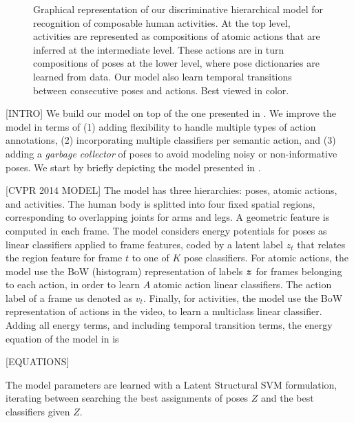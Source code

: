 \begin{figure}[tb]
\begin{center}
\fbox{\rule{0pt}{2in} \rule{0.9\linewidth}{0pt}}
\end{center}
   \caption{Graphical representation of our discriminative hierarchical model for recognition of composable human activities.
At the top level, activities are represented as compositions of atomic actions that are inferred at
the intermediate level. These actions are in turn compositions of poses at the
lower level, where pose dictionaries are learned from data. Our model also learn
temporal transitions between consecutive poses and actions. Best viewed in
color.}
\label{fig:overview}

\end{figure}

[INTRO] 
We build our model on top of the one presented in \cite{Lillo2014}. We improve the model in terms of (1) adding flexibility to handle multiple types of action annotations, (2) incorporating multiple classifiers per semantic action, and (3) adding a \emph{garbage collector} of poses to avoid modeling noisy or non-informative poses. We start by briefly depicting the model presented in \cite{Lillo2014}.

[CVPR 2014 MODEL] 
The model has three hierarchies: poses, atomic actions, and activities. The human body is splitted into four fixed spatial regions, corresponding to overlapping joints for arms and legs. A geometric feature is computed in each frame. The model considers energy potentials for poses as linear classifiers applied to frame features, coded by a latent label $z_t$ that relates the region feature for frame $t$ to one of $K$ pose classifiers. For atomic actions, the model use the BoW (histogram) representation of labels ${\boldsymbol z}$ for frames belonging to each action, in order to learn $A$ atomic action linear classifiers. The action label of a frame us denoted as $v_t$. Finally, for activities, the model use the BoW representation of actions in the video, to learn a multiclass linear classifier. Adding all energy terms, and including temporal transition terms, the energy equation of the model in \cite{Lillo2014} is 

[EQUATIONS] 

The model parameters are learned with a Latent Structural SVM formulation, iterating between searching the best assignments of poses $Z$ and the best classifiers given $Z$. 


